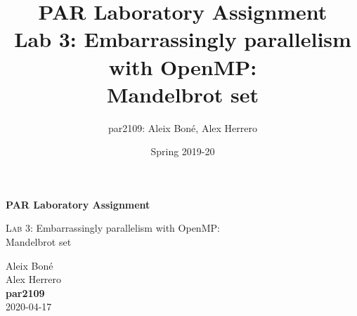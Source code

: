 

\usepackage[justification=centering]{caption}
\usepackage{subcaption}
\usepackage{graphicx}
\usepackage{enumitem}
\usepackage{lipsum}

\usepackage{siunitx}
\usepackage{hyphenat}

\usepackage{xcolor}


\usepackage[newfloat]{minted}
\captionsetup[listing]{position=top}


\renewcommand\theadfont{\bfseries}

\title{
    PAR Laboratory Assignment\\
    Lab 3: Embarrassingly parallelism with OpenMP:\\ Mandelbrot set
}

\author{
    par2109:
    Aleix Boné,
    Alex Herrero
}

\date{
    Spring 2019-20
}



\thispagestyle{empty}
\clearpage
\setcounter{page}{-1}

\begin{titlepage}
{
    \centering
    \null
    \vfill
    {\Huge \bfseries PAR Laboratory Assignment\par}
    \vspace{3em}
    {\Large {\scshape Lab 3:} Embarrassingly parallelism with OpenMP: \\ Mandelbrot set \par}
    \vfill
\begin{center}
\end{center}
    \vspace{3cm}

    \vfill
    {\raggedleft \Large
        Aleix Boné\\
        Alex Herrero\\
        {\bfseries\ttfamily par2109}\\
        \vspace{4em}
        2020-04-17
        \par}
}
\end{titlepage}

\null
\vspace{5em}

